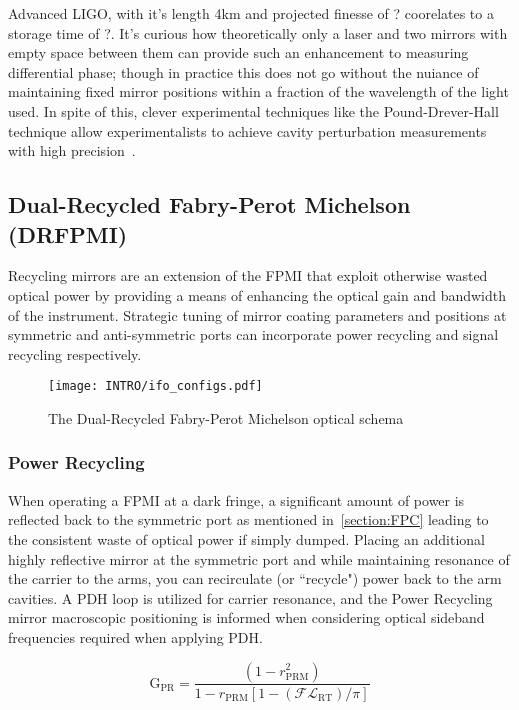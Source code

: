 Advanced LIGO, with it's length 4km and projected finesse of ? coorelates to a storage time of ?.
It's curious how theoretically only a laser and two mirrors with empty space between them can provide such an enhancement to measuring differential phase; though in practice this does not go without the nuiance of maintaining fixed mirror positions within a fraction of the wavelength of the light used. In spite of this, clever experimental techniques like the Pound-Drever-Hall technique allow experimentalists to achieve cavity perturbation measurements with high precision~\cite{?}. 

\subsection{Dual-Recycled Fabry-Perot Michelson (DRFPMI)}
Recycling mirrors are an extension of the FPMI that exploit otherwise wasted optical power by providing a means of enhancing the optical gain and bandwidth of the instrument. Strategic tuning of mirror coating parameters and positions at symmetric and anti-symmetric ports can incorporate power recycling and signal recycling respectively.

\begin{figure}[H]
\begin{center}
\texttt{[image: INTRO/ifo\_configs.pdf]}
\end{center}
\caption{The Dual-Recycled Fabry-Perot Michelson optical schema}
\label{fig:drfp_michelson}
\end{figure}

\subsubsection{Power Recycling}
When operating a FPMI at a dark fringe, a significant amount of power is reflected back to the symmetric port as mentioned in~\ref{section:FPC} leading to the consistent waste of optical power if simply dumped. Placing an additional highly reflective mirror at the symmetric port and while maintaining resonance of the carrier to the arms, you can recirculate (or ``recycle") power back to the arm cavities. A PDH loop is utilized for carrier resonance, and the Power Recycling mirror macroscopic positioning is informed when considering optical sideband frequencies required when applying PDH. 

\begin{equation}
	\mathrm{G_{PR}} = \frac{(1-r_\mathrm{PRM}^2)}{1-r_\mathrm{PRM}[1- (\mathscr{F} \mathscr{L}_\mathrm{RT})/ \pi]}
\end{equation}


